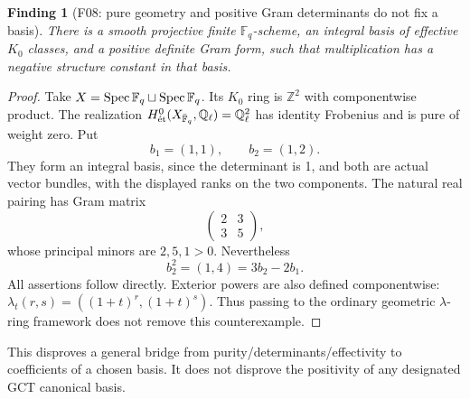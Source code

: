 \documentclass[11pt,a4paper]{article}
\newcommand{\Q}{\mathbb Q}\newcommand{\Z}{\mathbb Z}\newcommand{\C}{\mathbb C}\newcommand{\N}{\mathbb N}\newcommand{\F}{\mathbb F}
\newcommand{\fid}[1]{\textsf{#1}}\newcommand{\gate}[1]{\textsf{#1}}
\theoremstyle{named}\newtheorem{finding}{Finding}[section]
\theoremstyle{definition}\newtheorem{definition}[finding]{Definition}
\theoremstyle{remark}\newtheorem{remark}[finding]{Remark}
\begin{document}
\begin{finding}[\fid{F08}: pure geometry and positive Gram determinants do not fix a basis]\label{f:twopoints}
There is a smooth projective finite \(\F_q\)-scheme, an integral basis of effective $K_0$ classes, and a positive definite Gram form, such that multiplication has a negative structure constant in that basis.
\end{finding}
\begin{proof}
Take $X=\Spec\F_q\sqcup\Spec\F_q$. Its $K_0$ ring is $\Z^2$ with componentwise product. The realization $H^0_{\et}(X_{\bar{\F}_q},\Q_\ell)=\Q_\ell^2$ has identity Frobenius and is pure of weight zero. Put
\[
 b_1=(1,1),\qquad b_2=(1,2).
\]
They form an integral basis, since the determinant is 1, and both are actual vector bundles, with the displayed ranks on the two components. The natural real pairing has Gram matrix
\[
 \begin{pmatrix}2&3\\3&5\end{pmatrix},
\]
whose principal minors are $2,5,1>0$. Nevertheless
\[
 b_2^2=(1,4)=3b_2-2b_1.
\]
All assertions follow directly. Exterior powers are also defined componentwise: $\lambda_t(r,s)=((1+t)^r,(1+t)^s)$. Thus passing to the ordinary geometric $\lambda$-ring framework does not remove this counterexample.
\end{proof}
This disproves a general bridge from purity/determinants/effectivity to coefficients of a chosen basis. It does not disprove the positivity of any designated GCT canonical basis.
\end{document}
